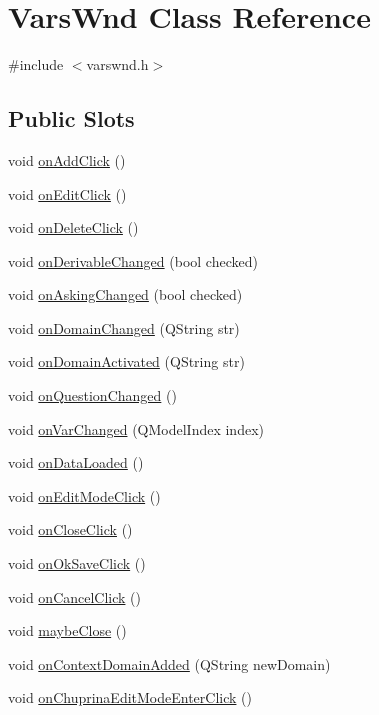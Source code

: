 \hypertarget{class_vars_wnd}{
\section{VarsWnd Class Reference}
\label{class_vars_wnd}
}


{\ttfamily \#include $<$varswnd.h$>$}

\subsection*{Public Slots}
\begin{DoxyCompactItemize}
\item 
void \hyperlink{class_vars_wnd_ab10e1b6b13fa87e23c0a92263592d3c0}{onAddClick} ()
\item 
void \hyperlink{class_vars_wnd_a01674e1b67cb71fa627830a2cd369145}{onEditClick} ()
\item 
void \hyperlink{class_vars_wnd_af63dbadd0aeda70ff3d80819ea275c4b}{onDeleteClick} ()
\item 
void \hyperlink{class_vars_wnd_ae3702924a06a3114e57424c1d2e1f80d}{onDerivableChanged} (bool checked)
\item 
void \hyperlink{class_vars_wnd_a74db5349a4808ef62530fdccc53aa58a}{onAskingChanged} (bool checked)
\item 
void \hyperlink{class_vars_wnd_a3ff3d237f83d80b3e3ab656f2b4ab090}{onDomainChanged} (QString str)
\item 
void \hyperlink{class_vars_wnd_a2c656e0ad8d6018ea8edc9307f0259b2}{onDomainActivated} (QString str)
\item 
void \hyperlink{class_vars_wnd_a06478a6d9bb39efceae9a97847a40895}{onQuestionChanged} ()
\item 
void \hyperlink{class_vars_wnd_a493278286420972f1b5d917e08731cfb}{onVarChanged} (QModelIndex index)
\item 
void \hyperlink{class_vars_wnd_a4c4032857d5a40b62f0aca4734c01c26}{onDataLoaded} ()
\item 
void \hyperlink{class_vars_wnd_a2557af5bbe70aabaaf817f7135642e1d}{onEditModeClick} ()
\item 
void \hyperlink{class_vars_wnd_ab0bde4ab6e7f04c76f395bf7b8a2a987}{onCloseClick} ()
\item 
void \hyperlink{class_vars_wnd_a982ed9e20c6e32ae2815a9ed4529d661}{onOkSaveClick} ()
\item 
void \hyperlink{class_vars_wnd_a858d49e2fb4a81a809e433d8d88a0e17}{onCancelClick} ()
\item 
void \hyperlink{class_vars_wnd_ac623bc54f1ddb7b5bb26aa466cbed089}{maybeClose} ()
\item 
void \hyperlink{class_vars_wnd_aeb7b56494bab9157a608b3cc68af338d}{onContextDomainAdded} (QString newDomain)
\item 
void \hyperlink{class_vars_wnd_a171669c7092a188a18d662aa9440fca0}{onChuprinaEditModeEnterClick} ()
\end{DoxyCompactItemize}

